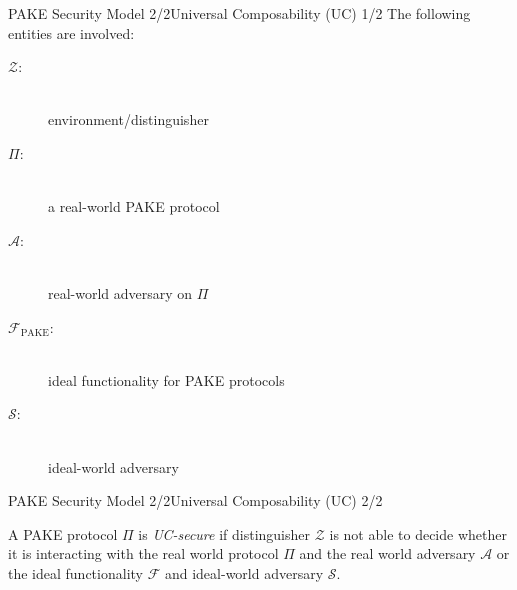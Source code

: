 \documentclass[notes,xcolor=dvipsnames]{beamer}
\begin{document}
\begin{frame}{PAKE Security Model 2/2}{Universal Composability (UC) 1/2}
The following entities are involved:
\begin{description}
    \item[$\mathcal{Z}$:] \hfill \\ environment/distinguisher
    \item[$\Pi$:] \hfill \\ a real-world PAKE protocol
    \item[$\mathcal{A}$:] \hfill \\ real-world adversary on $\Pi$
    \item[$\mathcal{F}_{\text{PAKE}}$:] \hfill \\ ideal functionality for PAKE protocols
    \item[$\mathcal{S}$:] \hfill \\ ideal-world adversary
\end{description}
\end{frame}

\begin{frame}{PAKE Security Model 2/2}{Universal Composability (UC) 2/2}
\begin{definition}[UC-Security]\label{def:uc}
A PAKE protocol $\Pi$ is \emph{UC-secure} if distinguisher $\mathcal{Z}$ is not able to decide whether it is interacting with the real world protocol $\Pi$ and the real world adversary $\mathcal{A}$ or the ideal functionality $\mathcal{F}$ and ideal-world adversary $\mathcal{S}$.
\end{definition}

\end{frame}
\end{document}
